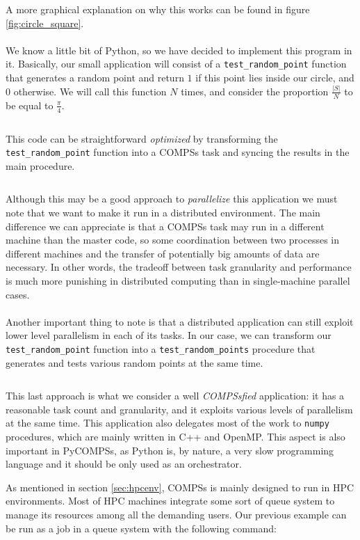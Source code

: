 A more graphical explanation on why this works can be found in figure \ref{fig:circle_square}.\\
\\
We know a little bit of Python, so we have decided to implement this program in it. Basically, our small application will consist of a \verb|test_random_point| function that generates a random point and return $1$ if this point lies inside our circle, and $0$ otherwise. We will call this function $N$ times, and consider the proportion $\frac{|S|}{N}$ to be equal to $\frac{\pi}{4}$.
\inputminted{python}{applications/PI_SQUARE/sequential.py}
This code can be straightforward \textit{optimized} by transforming the \verb|test_random_point| function into a COMPSs task and syncing the results in the main procedure.
\inputminted{python}{applications/PI_SQUARE/pycompss_naive.py}
Although this may be a good approach to \textit{parallelize} this application we must note that we want to make it run in a distributed environment. The main difference we can appreciate is that a COMPSs task may run in a different machine than the master code, so some coordination between two processes in different machines and the transfer of potentially big amounts of data are necessary. In other words, the tradeoff between task granularity and performance is much more punishing in distributed computing than in single-machine parallel cases.\\
\\
Another important thing to note is that a distributed application can still exploit lower level parallelism in each of its tasks. In our case, we can transform our \verb|test_random_point| function into a \verb|test_random_points| procedure that generates and tests various random points at the same time.

\inputminted{python}{applications/PI_SQUARE/pycompss_vectorized.py}

This last approach is what we consider a well \textit{COMPSsfied} application: it has a reasonable task count and granularity, and it exploits various levels of parallelism at the same time. This application also delegates most of the work to \verb|numpy| procedures, which are mainly written in C++ and OpenMP. This aspect is also important in PyCOMPSs, as Python is, by nature, a very slow programming language and it should be only used as an orchestrator.

As mentioned in section \ref{sec:hpcenv}, COMPSs is mainly designed to run in HPC environments. Most of HPC machines integrate some sort of queue system to manage its resources among all the demanding users. Our previous example can be run as a job in a queue system with the following command:

\inputminted{bash}{applications/PI_SQUARE/run_mn4.sh}


